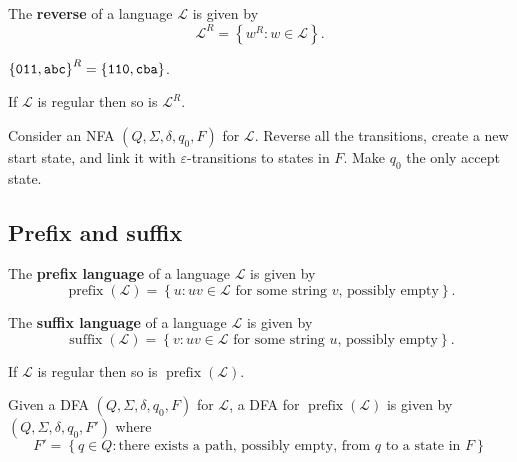 \documentclass{notes}
\begin{document}
\begin{defn}
  The {\boldmath \bfseries reverse} of a language $\mathcal L$ is given by
  \[
    \mathcal L^R = \left \{ w^R : w \in \mathcal L \right \}.
  \]
\end{defn}

\begin{eg}
  $\left \{ \verb~011~, \verb~abc~ \right \}^R = \left \{ \verb~110~, \verb~cba~ \right \}$.
\end{eg}

\begin{thm}
  If $\mathcal L$ is regular then so is $\mathcal L^R$.
\end{thm}

\begin{prf}
  Consider an NFA $(Q, \Sigma, \delta, q_0, F)$ for $\mathcal L$.
  Reverse all the transitions, create a new start state, and link it with $\varepsilon$-transitions to states in $F$.
  Make $q_0$ the only accept state.
\end{prf}

\newpage

\subsection{Prefix and suffix}

\begin{defn}
  The {\boldmath \bfseries prefix language} of a language $\mathcal L$ is given by 
  \[
    \operatorname{prefix}(\mathcal L) = \left \{ u : u v \in \mathcal L \text{ for some string $v$, possibly empty} \right \}.
  \]
\end{defn}

\begin{defn}
  The {\boldmath \bfseries suffix language} of a language $\mathcal L$ is given by 
  \[
    \operatorname{suffix}(\mathcal L) = \left \{ v : u v \in \mathcal L \text{ for some string $u$, possibly empty} \right \}.
  \]
\end{defn}

\begin{thm}
  If $\mathcal L$ is regular then so is $\operatorname{prefix}(\mathcal L)$.
\end{thm}

\begin{prf}
  Given a DFA $(Q, \Sigma, \delta, q_0, F)$ for $\mathcal L$, a DFA for $\operatorname{prefix}(\mathcal L)$ is given by $(Q, \Sigma, \delta, q_0, F')$ where 
  \[
    F' = \left \{ q \in Q : \text{there exists a path, possibly empty, from $q$ to a state in $F$} \right \}
  \]
\end{prf}
\end{document}

